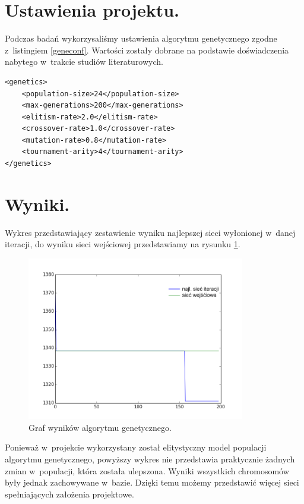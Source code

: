 \documentclass[twoside,12pt]{report}
\begin{document}
\section{Ustawienia projektu.}

Podczas badań wykorzysaliśmy ustawienia algorytmu genetycznego zgodne z~listingiem \ref{geneconf}. Wartości zostały dobrane na podstawie doświadczenia nabytego w~trakcie studiów literaturowych. 
	
\begin{lstlisting}[caption=Ustawienia algorytmu genetycznego podczas badań.,label=geneconf]
<genetics>
	<population-size>24</population-size>
	<max-generations>200</max-generations>
	<elitism-rate>2.0</elitism-rate>
	<crossover-rate>1.0</crossover-rate>
	<mutation-rate>0.8</mutation-rate>
	<tournament-arity>4</tournament-arity>
</genetics>
\end{lstlisting}

\clearpage
\section{Wyniki.}

Wykres przedstawiający zestawienie wyniku najlepszej sieci wyłonionej w~danej iteracji, do wyniku sieci wejściowej przedstawiamy na rysunku \ref{def_fitness}.

\begin{figure}[ht]
\centering
\includegraphics[width=0.85\textwidth]{img/fitness}
\caption{Graf wyników algorytmu genetycznego.}
\label{def_fitness}
\end{figure}

Ponieważ w~projekcie wykorzystany został elitystyczny model populacji algorytmu genetycznego, powyższy wykres nie przedstawia praktycznie żadnych zmian w~populacji, która została ulepszona. Wyniki wszystkich chromosomów były jednak zachowywane w~bazie. Dzięki temu możemy przedstawić więcej sieci spełniających założenia projektowe.
\end{document}
